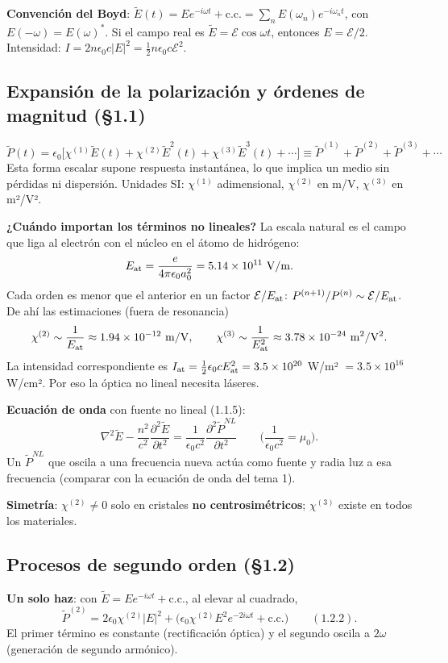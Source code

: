 \documentclass[10pt]{article}
\newcommand{\cc}{\text{c.c.}}
\begin{document}
\textbf{Convención del Boyd}: $\tilde E(t)=Ee^{-i\omega t}+\cc=\sum_nE(\omega_n)e^{-i\omega_nt}$, con $E(-\omega)=E(\omega)^*$. Si el campo real es $\tilde E=\mathcal E\cos\omega t$, entonces $E=\mathcal E/2$. Intensidad: $I=2n\epsilon_0c|E|^2=\frac12n\epsilon_0c\mathcal E^2$.

\subsection{Expansión de la polarización y órdenes de magnitud (§1.1)}
\begin{clave}[title={Polarización no lineal (1.1.2)}]
\[
\tilde P(t)=\epsilon_0\big[\chi^{(1)}\tilde E(t)+\chi^{(2)}\tilde E^2(t)+\chi^{(3)}\tilde E^3(t)+\cdots\big]\equiv\tilde P^{(1)}+\tilde P^{(2)}+\tilde P^{(3)}+\cdots
\]
Esta forma escalar supone respuesta instantánea, lo que implica un medio sin pérdidas ni dispersión. Unidades SI: $\chi^{(1)}$ adimensional, $\chi^{(2)}$ en m/V, $\chi^{(3)}$ en m²/V².
\end{clave}

\textbf{¿Cuándo importan los términos no lineales?} La escala natural es el campo que liga al electrón con el núcleo en el átomo de hidrógeno:
\[
E_{\rm at}=\frac{e}{4\pi\epsilon_0a_0^2}=5.14\times10^{11}\ \mathrm{V/m}.
\]
Cada orden es menor que el anterior en un factor $\mathcal E/E_{\rm at}$: $P^{(n+1)}/P^{(n)}\sim\mathcal E/E_{\rm at}$. De ahí las estimaciones (fuera de resonancia)
\[
\chi^{(2)}\sim\frac{1}{E_{\rm at}}\approx1.94\times10^{-12}\ \mathrm{m/V},\qquad \chi^{(3)}\sim\frac{1}{E_{\rm at}^2}\approx3.78\times10^{-24}\ \mathrm{m^2/V^2}.
\]
La intensidad correspondiente es $I_{\rm at}=\frac12\epsilon_0cE_{\rm at}^2=3.5\times10^{20}$ W/m² $=3.5\times10^{16}$ W/cm². Por eso la óptica no lineal necesita láseres.

\textbf{Ecuación de onda} con fuente no lineal (1.1.5):
\[
\nabla^2\tilde E-\frac{n^2}{c^2}\frac{\partial^2\tilde E}{\partial t^2}=\frac{1}{\epsilon_0c^2}\frac{\partial^2\tilde P^{NL}}{\partial t^2}\qquad\Big(\frac1{\epsilon_0c^2}=\mu_0\Big).
\]
Un $\tilde P^{NL}$ que oscila a una frecuencia nueva actúa como fuente y radia luz a esa frecuencia (comparar con la ecuación de onda del tema 1).

\textbf{Simetría}: $\chi^{(2)}\ne0$ solo en cristales \textbf{no centrosimétricos}; $\chi^{(3)}$ existe en todos los materiales.

\subsection{Procesos de segundo orden (§1.2)}
\textbf{Un solo haz}: con $\tilde E=Ee^{-i\omega t}+\cc$, al elevar al cuadrado,
\[
\tilde P^{(2)}=2\epsilon_0\chi^{(2)}|E|^2+\big(\epsilon_0\chi^{(2)}E^2e^{-2i\omega t}+\cc\big)\qquad(1.2.2).
\]
El primer término es constante (rectificación óptica) y el segundo oscila a $2\omega$ (generación de segundo armónico).
\end{document}
